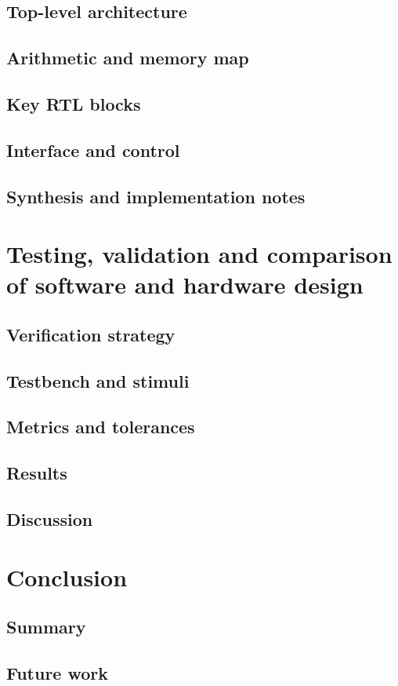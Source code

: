 \documentclass{svproc}
\begin{document}
\subsection{Top-level architecture}

\subsection{Arithmetic and memory map}

\subsection{Key RTL blocks}

\subsection{Interface and control}

\subsection{Synthesis and implementation notes}

\section{Testing, validation and comparison of software and hardware design}
\label{sec:test}

\subsection{Verification strategy}

\subsection{Testbench and stimuli}

\subsection{Metrics and tolerances}

\subsection{Results}

\subsection{Discussion}

\section{Conclusion}
\label{sec:conclusion}

\subsection{Summary}

\subsection{Future work}



\end{document}

